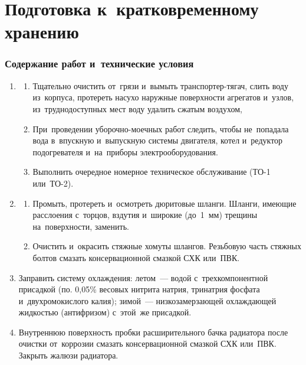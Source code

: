 \section{Подготовка к~кратковременному хранению}
\subsubsection{Содержание работ и~технические условия}
\begin{enumerate}
    \item \begin{enumerate}
        \item Тщательно очистить от~грязи и~вымыть транспортер-тягач, слить воду из~корпуса, протереть насухо наружные поверхности агрегатов и~узлов, из~труднодоступных мест воду удалить сжатым воздухом, 
        
        \item При~проведении уборочно-моечных работ следить, чтобы не~попадала вода в~впускную и~выпускную системы двигателя, котел и~редуктор подогревателя и~на~приборы электрооборудования. 
            
        \item Выполнить очередное номерное техническое обслуживание (ТО-1 или~ТО-2). 
    \end{enumerate}

    \item \begin{enumerate}
        \item Промыть, протереть и~осмотреть дюритовые шланги. Шланги, имеющие расслоения с~торцов, вздутия и~широкие (до~1~мм) трещины на~поверхности, заменить. 
        \item Очистить и~окрасить стяжные хомуты шлангов. Резьбовую часть стяжных болтов смазать консервационной смазкой СХК или~ПВК. 
    \end{enumerate}
    

    \item Заправить систему охлаждения: летом~--- водой с~трехкомпонентной присадкой (по. 0,05\% весовых нитрита натрия, тринатрия фосфата и~двухромокислого калия); зимой~--- низкозамерзающей охлаждающей жидкостью (антифризом) с~этой~же присадкой. 

    \item Внутреннюю поверхность пробки расширительного бачка радиатора после очистки от~коррозии смазать консервационной смазкой СХК или~ПВК. Закрыть жалюзи радиатора. 


\end{enumerate}
